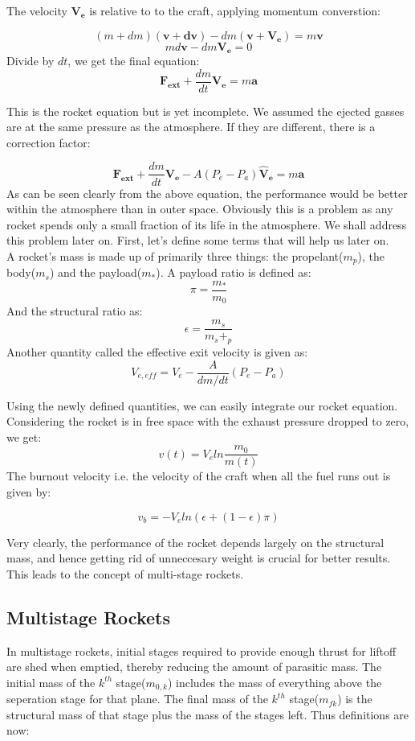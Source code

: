 \documentclass[12pt, letterpaper]{article}
\begin{document}
The velocity $\mathbf{V_e}$ is relative to to the craft, applying momentum converstion:

\[
	(m + dm)(\mathbf{v} + \mathbf{dv}) -dm(\mathbf{v} + \mathbf{V_e}) = m\mathbf{v}
\]
\[
	md\mathbf{v} -dm\mathbf{V_e} = 0
\]
Divide by $dt$, we get the final equation:
\[
	\mathbf{F_{ext}} + \frac{dm}{dt}\mathbf{V_e} = m\mathbf{a}
\]

This is the rocket equation but is yet incomplete. We assumed the ejected gasses are at the same pressure as the atmosphere. If they are different, there is a correction factor:

\[
	\mathbf{F_{ext}} + \frac{dm}{dt}\mathbf{V_e} - A(P_e - P_a)\mathbf{\hat{V}_e} = m\mathbf{a}
\]
As can be seen clearly from the above equation, the performance would be better within the atmosphere than in outer space. Obviously this is a problem as any rocket spends only a small fraction of its life in the atmosphere. We shall address this problem later on. First, let's define some terms that will help us later on.\\
A rocket's mass is made up of primarily three things: the propelant($m_p$), the body($m_s$) and the payload($m_*$). A payload ratio is defined as:
\[
	\pi = \frac{m_*}{m_0}
\]
And the structural ratio as:
\[
	\epsilon = \frac{m_s}{m_s+_p}
\]
Another quantity called the effective exit velocity is given as:
\[
	V_{e,eff} = V_e - \frac{A}{dm/dt}(P_e - P_a)
\]

Using the newly defined quantities, we can easily integrate our rocket equation. Considering the rocket is in free space with the exhaust pressure dropped to zero, we get:
\[
	v(t) = V_eln\frac{m_0}{m(t)}
\]
The burnout velocity i.e. the velocity of the craft when all the fuel runs out is given by:

\[
	v_b = -V_eln(\epsilon + (1-\epsilon) \pi)
\]

Very clearly, the performance of the rocket depends largely on the structural mass, and hence getting rid of unneccesary weight is crucial for better results. This leads to the concept of multi-stage rockets.

\subsection{Multistage Rockets}
In multistage rockets, initial stages required to provide enough thrust for liftoff are shed when emptied, thereby reducing the amount of parasitic mass. The initial mass of the $k^{th}$ stage($m_{0,k} $) includes the mass of everything above the seperation stage for that plane. The final mass of the $k^{th}$ stage($m_{fk} $) is the structural mass of that stage plus the mass of the stages left. Thus definitions are now:
\end{document}
